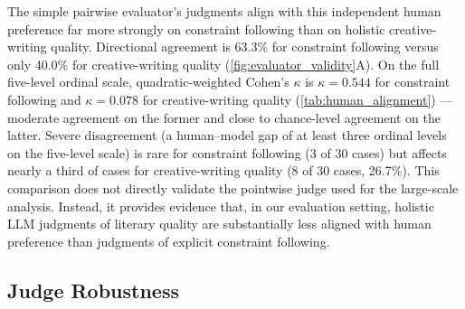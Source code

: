 The simple pairwise evaluator's judgments align with this independent human preference far more strongly on constraint following than on holistic creative-writing quality. Directional agreement is 63.3\% for constraint following versus only 40.0\% for creative-writing quality (\cref{fig:evaluator_validity}A). On the full five-level ordinal scale, quadratic-weighted Cohen's $\kappa$ is $\kappa = 0.544$ for constraint following and $\kappa = 0.078$ for creative-writing quality (\cref{tab:human_alignment}) --- moderate agreement on the former and close to chance-level agreement on the latter. Severe disagreement (a human--model gap of at least three ordinal levels on the five-level scale) is rare for constraint following (3 of 30 cases) but affects nearly a third of cases for creative-writing quality (8 of 30 cases, 26.7\%). This comparison does not directly validate the pointwise judge used for the large-scale analysis. Instead, it provides evidence that, in our evaluation setting, holistic LLM judgments of literary quality are substantially less aligned with human preference than judgments of explicit constraint following.

\subsection{Judge Robustness}
\label{sec:disc_robustness}

